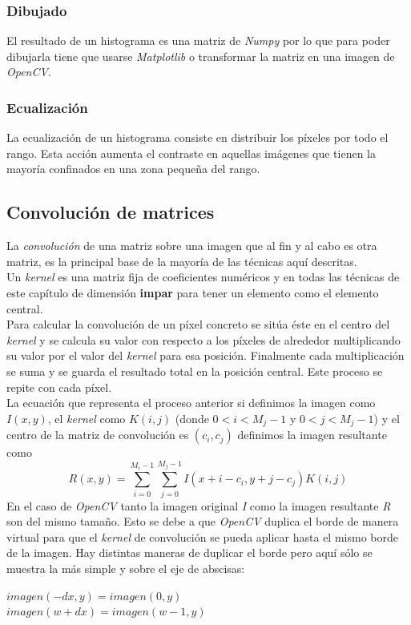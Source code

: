 \subsubsection{Dibujado}
El resultado de un histograma es una matriz de \emph{Numpy} por lo que
para poder dibujarla tiene que usarse \emph{Matplotlib} o transformar
la matriz en una imagen de \emph{OpenCV}.

\subsubsection{Ecualización}
La ecualización de un histograma consiste en distribuir los píxeles
por todo el rango. Esta acción aumenta el contraste en aquellas
imágenes que tienen la mayoría confinados en una zona pequeña del
rango.

\subsection{Convolución de matrices}
La \emph{convolución} de una matriz sobre una imagen que al fin y al
cabo es otra matriz, es la principal base de la mayoría de las
técnicas aquí descritas. \\
Un \emph{kernel} es una matriz fija de coeficientes numéricos y en
todas las técnicas de este capítulo de dimensión \textbf{impar}
para tener un elemento como el elemento central. \\
Para calcular la convolución de un píxel concreto se sitúa éste en el
centro del \emph{kernel} y se calcula su valor con respecto a los
píxeles de alrededor multiplicando su valor por el valor del
\emph{kernel} para esa posición. Finalmente cada multiplicación se
suma y se guarda el resultado total en la posición central. Este
proceso se repite con cada píxel. \\
La ecuación que representa el proceso anterior si definimos la imagen
como $I(x, y)$, el \emph{kernel} como $K(i, j)$ (donde
$0 < i < M_j - 1$ y $0 < j < M_j - 1$) y el centro de la matriz de
convolución es $(c_i, c_j)$ definimos la imagen resultante como
\begin{equation*}
  R(x, y) = \sum_{i=0}^{M_i-1} \sum_{j=0}^{M_j-1}  I(x + i - c_i, y + j - c_j)K(i,j)
\end{equation*}
En el caso de \emph{OpenCV} tanto la imagen original \emph{I} como la
imagen resultante \emph{R} son del mismo tamaño. Esto se debe a que
\emph{OpenCV} duplica el borde de manera virtual para que el
\emph{kernel} de convolución se pueda aplicar hasta el mismo borde de
la imagen. Hay distintas maneras de duplicar el borde pero aquí sólo
se muestra la más simple y sobre el eje de abscisas:
\begin{center}
$imagen(-dx, y) = imagen(0, y)$
\\
$imagen(w + dx) = imagen(w - 1, y)$
\end{center}


